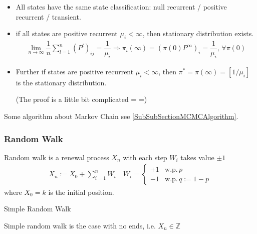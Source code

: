 \begin{itemize}[topsep=2pt,itemsep=0pt]
    \item All states have the same state classification: null recurrent / positive recurrent / transient.
    \item if all states are positive recurrent $ \mu _i<\infty $, then stationary distribution exists.
    \begin{align}
        \lim_{n\to \infty}\dfrac{1}{n}\sum_{l=1}^n(P^l)_{ij}=\dfrac{1}{\mu _i}\Rightarrow \pi_i(\infty)=(\pi(0)P^\infty)_i= \dfrac{1}{\mu _i},\, \forall \pi(0)
    \end{align}
    \item Further if states are positive recurrent $ \mu _i<\infty $, then $ \pi^*=\pi(\infty)=[1/\mu _i] $ is the stationary distribution.

    (The proof is a little bit complicated = =)
    
\end{itemize}

Some algorithm about Markov Chain see \autoref{SubSubSectionMCMCAlgorithm}.







\subsubsection{Random Walk}

Random walk is a renewal process $ X_n $ with each step $ W_i $ takes value $ \pm 1 $
\begin{align}
    X_n := X_0 +\sum_{i=1}^nW_i\quad W_i=\begin{cases}
        +1&\mathrm{w.p.}\, p\\
        -1&\mathrm{w.p.}\, q:=1-p  
    \end{cases}
\end{align}
where $ X_0=k $ is the initial position.

\begin{point}
    Simple Random Walk
\end{point}

Simple random walk is the case with no ends, i.e. $ X_n\in \mathbb{Z} $


